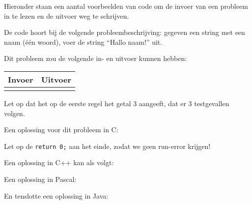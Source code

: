 \documentclass[11pt,titlepage,a4paper]{article}
\begin{document}
Hieronder staan een aantal voorbeelden van code om de invoer van een
probleem in te lezen en de uitvoer weg te schrijven.

De code hoort bij de volgende probleembeschrijving: gegeven een string
met een naam (\'e\'en woord), voer de string ``Hallo naam!'' uit.

Dit probleem zou de volgende in- en uitvoer kunnen hebben:

\begin{tabular}{|p{}|p{}|}
\hline
\textbf{Invoer} & \textbf{Uitvoer} \\
\hline
 &
 \\
\hline
\end{tabular}

Let op dat het op de eerste regel het getal 3 aangeeft, dat er 3
testgevallen volgen.

Een oplossing voor dit probleem in C:


Let op de \texttt{return 0;} aan het einde, zodat we geen
run-error krijgen!

Een oplossing in C++ kan als volgt:


Een oplossing in Pascal:


En tenslotte een oplossing in Java:

\end{document}
